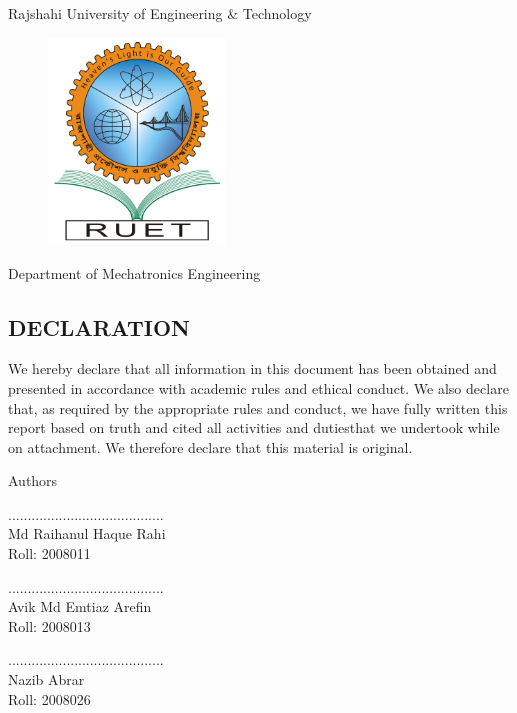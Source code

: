 \begin{center}
    Rajshahi University of Engineering \& Technology
\end{center}
\begin{figure}[h!]
    \centering
    \includegraphics[width=4.7cm]{figs/RUET.png}
\end{figure}
\begin{center}
    Department of Mechatronics Engineering
    \subsection*{DECLARATION}
\end{center}

\noindent We hereby declare that all information in this document has been obtained and presented in accordance with academic rules and ethical conduct. We also declare that, as required by the appropriate rules and conduct, we have fully written this report based on truth and cited all activities and dutiesthat we undertook while on attachment. We therefore declare that this material is original.

\singlespacing
\begin{center}

Authors

\vspace{0.5cm}

........................................ \\
Md Raihanul Haque Rahi \\
Roll: 2008011

\vspace{0.5cm}

........................................ \\
Avik Md Emtiaz Arefin \\
Roll: 2008013

\vspace{0.5cm}

........................................ \\
Nazib Abrar \\
Roll: 2008026
\end{center}
\doublespacing